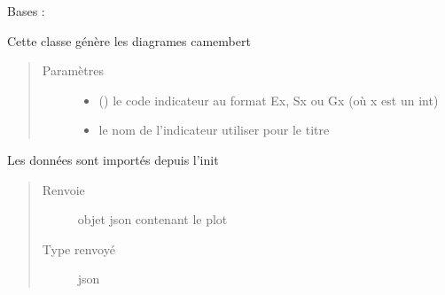 \documentclass[letterpaper,10pt,french]{sphinxmanual}
\begin{document}
\begin{fulllineitems}
\label{\detokenize{app.home.content_gen:app.home.content_gen.graph_generation.PieChart}}
\sphinxAtStartPar
Bases : 

\sphinxAtStartPar
Cette classe génère les diagrames camembert
\begin{quote}\begin{description}
\item[{Paramètres}] \leavevmode\begin{itemize}
\item {} 
\sphinxAtStartPar
{} () \textendash{} le code indicateur au format Ex, Sx ou Gx (où x est un int)

\item {} 
\sphinxAtStartPar
{} \textendash{} le nom de l’indicateur utiliser pour le titre

\end{itemize}

\end{description}\end{quote}

\begin{fulllineitems}
\label{\detokenize{app.home.content_gen:app.home.content_gen.graph_generation.PieChart.plot}}
\sphinxAtStartPar
Les données sont importés depuis l’init
\begin{quote}\begin{description}
\item[{Renvoie}] \leavevmode
\sphinxAtStartPar
objet json contenant le plot

\item[{Type renvoyé}] \leavevmode
\sphinxAtStartPar
json

\end{description}\end{quote}

\end{fulllineitems}


\end{fulllineitems}
\end{document}
